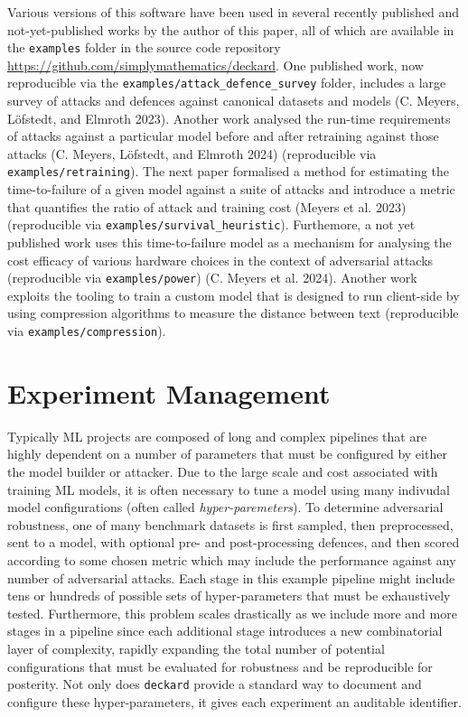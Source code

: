 \documentclass[
]{article}
\begin{document}
Various versions of this software have been used in several recently
published and not-yet-published works by the author of this paper, all
of which are available in the \texttt{examples} folder in the source
code repository \url{https://github.com/simplymathematics/deckard}. One
published work, now reproducible via the
\texttt{examples/attack\_defence\_survey} folder, includes a large
survey of attacks and defences against canonical datasets and models (C.
Meyers, Löfstedt, and Elmroth 2023). Another work analysed the run-time
requirements of attacks against a particular model before and after
retraining against those attacks (C. Meyers, Löfstedt, and Elmroth 2024)
(reproducible via \texttt{examples/retraining}). The next paper
formalised a method for estimating the time-to-failure of a given model
against a suite of attacks and introduce a metric that quantifies the
ratio of attack and training cost (Meyers et al. 2023) (reproducible via
\texttt{examples/survival\_heuristic}). Furthemore, a not yet published
work uses this time-to-failure model as a mechanism for analysing the
cost efficacy of various hardware choices in the context of adversarial
attacks (reproducible via \texttt{examples/power}) (C. Meyers et al.
2024). Another work exploits the tooling to train a custom model that is
designed to run client-side by using compression algorithms to measure
the distance between text (reproducible via
\texttt{examples/compression}).

\hypertarget{experiment-management}{%
\section{Experiment Management}\label{experiment-management}}

Typically ML projects are composed of long and complex pipelines that
are highly dependent on a number of parameters that must be configured
by either the model builder or attacker. Due to the large scale and cost
associated with training ML models, it is often necessary to tune a
model using many indivudal model configurations (often called
\emph{hyper-paremeters}). To determine adversarial robustness, one of
many benchmark datasets is first sampled, then preprocessed, sent to a
model, with optional pre- and post-processing defences, and then scored
according to some chosen metric which may include the performance
against any number of adversarial attacks. Each stage in this example
pipeline might include tens or hundreds of possible sets of
hyper-parameters that must be exhaustively tested. Furthermore, this
problem scales drastically as we include more and more stages in a
pipeline since each additional stage introduces a new combinatorial
layer of complexity, rapidly expanding the total number of potential
configurations that must be evaluated for robustness and be reproducible
for posterity. Not only does \texttt{deckard} provide a standard way to
document and configure these hyper-parameters, it gives each experiment
an auditable identifier.
\end{document}
